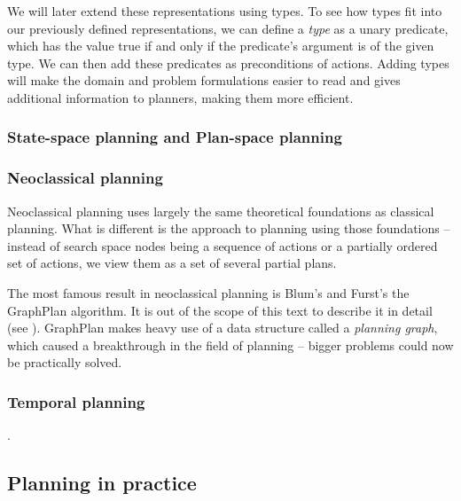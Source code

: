 We will later extend these representations using types.
To see how types fit into our previously defined representations, we can
define a \textit{type} as a unary predicate, which has the value true
if and only if the predicate's argument is of the given type.
We can then add these predicates as preconditions of actions.
Adding types will make the domain and problem formulations
easier to read and gives additional information
to planners, making them more efficient.
\cite[Section 2.4.1]{Ghallab2004}

\subsubsection{State-space planning and Plan-space planning}


\subsubsection{Neoclassical planning}

Neoclassical planning uses largely the same theoretical foundations as classical 
planning. What is different is the approach to planning using those foundations
-- instead of search space nodes being a sequence of actions or a partially ordered
set of actions, we view them as a set of several partial plans.
\cite[Part~II]{Ghallab2004}

The most famous result in neoclassical planning is Blum's and Furst's the GraphPlan algorithm. \cite{Blum1997}
It is out of the scope of this text to describe it in detail
(see \cite[Section~6.3]{Ghallab2004}).
GraphPlan makes heavy use of a data structure called a \textit{planning graph},
which caused a breakthrough in the field of planning -- bigger problems could
now be practically solved.


\subsubsection{Temporal planning}

.



\subsection{Planning in practice}

